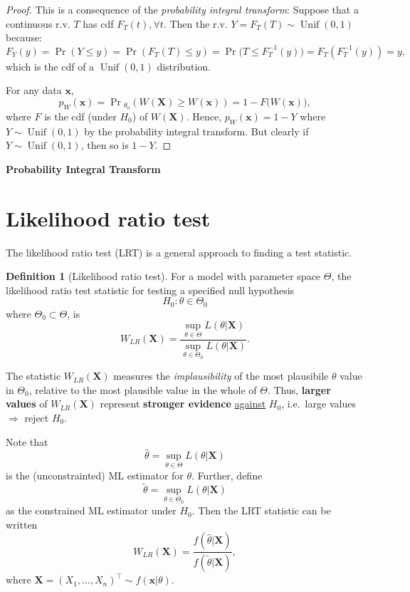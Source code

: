 \documentclass[
]{book}
\newcommand{\bx}{{\boldsymbol x}}
\newcommand{\bX}{{\boldsymbol X}}
\DeclareMathOperator{\Unif}{Unif}
\theoremstyle{definition}
\newtheorem{definition}{Definition}[chapter]
\theoremstyle{definition}
\theoremstyle{definition}
\theoremstyle{definition}
\theoremstyle{remark}
\begin{document}
\begin{proof}
This is a consequence of the \emph{probability integral transform}: Suppose that a continuous r.v. \(T\) has cdf \(F_T(t), \forall t\). Then the r.v. \(Y=F_T(T)\sim\Unif(0,1)\) because:
\[
F_Y(y)=\Pr(Y\leq y) = \Pr(F_T(T)\leq y) = \Pr\big(T \leq F^{-1}_T(y)\big) = F_T\left(F^{-1}_T(y) \right) = y,
\]
which is the cdf of a \(\Unif(0,1)\) distribution.

For any data \(\bx\),
\[
p_W(\bx) =  \Pr\!{}_{\theta_0}\left(W(\bX) \geq W(\bx) \right) = 1 - F\big( W(\bx) \big),
\]
where \(F\) is the cdf (under \(H_0\)) of \(W(\bX)\). Hence, \(p_W(\bx)=1-Y\) where \(Y\sim\Unif(0,1)\) by the probability integral transform. But clearly if \(Y\sim\Unif(0,1)\), then so is \(1-Y\).
\end{proof}

\textbf{Probability Integral Transform}

\hypertarget{likelihood-ratio-test}{%
\section{Likelihood ratio test}\label{likelihood-ratio-test}}

The likelihood ratio test (LRT) is a general approach to finding a test statistic.

\begin{definition}[Likelihood ratio test]
For a model with parameter space \(\Theta\), the likelihood ratio test statistic for testing a specified null hypothesis
\[
H_0: \theta \in \Theta_0
\]
where \(\Theta_0\subset \Theta\), is
\[
W_{LR}(\bX) = \frac{\sup_{\theta\in\Theta} L(\theta|\bX)}{\sup_{\theta\in\Theta_0} L(\theta|\bX)}.
\]
\end{definition}

The statistic \(W_{LR}(\bX)\) measures the \emph{implausibility} of the most plausibile \(\theta\) value in \(\Theta_0\), relative to the most plausible value in the whole of \(\Theta\).
Thus, \textbf{larger values} of \(W_{LR}(\bX)\) represent \textbf{stronger evidence} \underline{against} \(H_0\), i.e.~large values \(\Rightarrow\) reject \(H_0\).

Note that
\[
\hat \theta = \sup_{\theta\in\Theta} L(\theta|\bX)
\]
is the (unconstrainted) ML estimator for \(\theta\).
Further, define
\[
\tilde \theta = \sup_{\theta\in\Theta_0} L(\theta|\bX)
\]
as the constrained ML estimator under \(H_0\). Then the LRT statistic can be written
\[
W_{LR}(\bX) = \frac{f(\hat\theta|\bX)}{f(\tilde\theta|\bX)},
\]
where \(\bX = (X_1,\dots,X_n)^\top \sim f(\bx|\theta)\).
\end{document}
